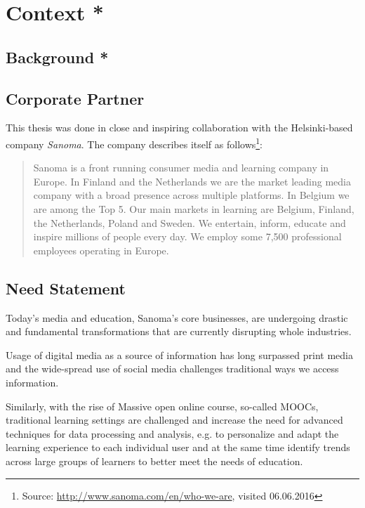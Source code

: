 
\clearpage
\section{Context *}

\subsection{Background *}



\subsection{Corporate Partner}

This thesis was done in close and inspiring collaboration with the Helsinki-based company \emph{Sanoma}. The company describes itself as follows\footnote{Source: \url{http://www.sanoma.com/en/who-we-are}, visited 06.06.2016}:

\blockquote{Sanoma is a front running consumer media and learning company in Europe. In Finland and the Netherlands we are the market leading media company with a broad presence across multiple platforms. In Belgium we are among the Top 5. Our main markets in learning are Belgium, Finland, the Netherlands, Poland and Sweden. We entertain, inform, educate and inspire millions of people every day. We employ some 7,500 professional employees operating in Europe.}

\subsection{Need Statement}

Today's media and education, Sanoma's core businesses, are undergoing drastic and fundamental transformations that are currently disrupting whole industries. 

Usage of digital media as a source of information has long surpassed print media  and the wide-spread use of social media challenges traditional ways we access information. 

Similarly, with the rise of Massive open online course, so-called MOOCs, traditional learning settings are challenged and increase the need for advanced techniques for data processing and analysis, e.g. to personalize and adapt the learning experience to each individual user and at the same time identify trends across large groups of learners to better meet the needs of education.

